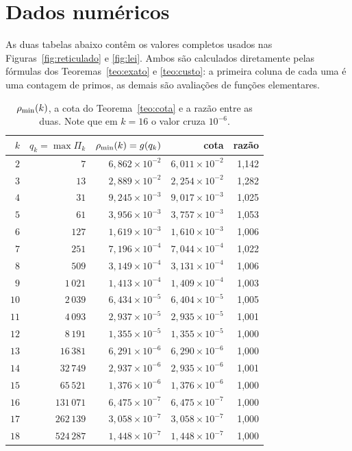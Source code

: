 \section{Dados numéricos}\label{ap:dados}

As duas tabelas abaixo contêm os valores completos usados nas
Figuras~\ref{fig:reticulado} e \ref{fig:lei}. Ambos são calculados diretamente
pelas fórmulas dos Teoremas~\ref{teo:exato} e \ref{teo:custo}: a primeira coluna de
cada uma é uma contagem de primos, as demais são avaliações de funções
elementares.

\begin{table}[htbp]
\centering
\small
\begin{tabular}{rrrrr}
\toprule
$k$ & $q_k=\max\Pi_k$ & $\rho_{\min}(k)=g(q_k)$ & cota & razão \\
\midrule
$2$  & $7$        & $6{,}862\times10^{-2}$ & $6{,}011\times10^{-2}$ & 1,142 \\
$3$  & $13$       & $2{,}889\times10^{-2}$ & $2{,}254\times10^{-2}$ & 1,282 \\
$4$  & $31$       & $9{,}245\times10^{-3}$ & $9{,}017\times10^{-3}$ & 1,025 \\
$5$  & $61$       & $3{,}956\times10^{-3}$ & $3{,}757\times10^{-3}$ & 1,053 \\
$6$  & $127$      & $1{,}619\times10^{-3}$ & $1{,}610\times10^{-3}$ & 1,006 \\
$7$  & $251$      & $7{,}196\times10^{-4}$ & $7{,}044\times10^{-4}$ & 1,022 \\
$8$  & $509$      & $3{,}149\times10^{-4}$ & $3{,}131\times10^{-4}$ & 1,006 \\
$9$  & $1\,021$   & $1{,}413\times10^{-4}$ & $1{,}409\times10^{-4}$ & 1,003 \\
$10$ & $2\,039$   & $6{,}434\times10^{-5}$ & $6{,}404\times10^{-5}$ & 1,005 \\
$11$ & $4\,093$   & $2{,}937\times10^{-5}$ & $2{,}935\times10^{-5}$ & 1,001 \\
$12$ & $8\,191$   & $1{,}355\times10^{-5}$ & $1{,}355\times10^{-5}$ & 1,000 \\
$13$ & $16\,381$  & $6{,}291\times10^{-6}$ & $6{,}290\times10^{-6}$ & 1,000 \\
$14$ & $32\,749$  & $2{,}937\times10^{-6}$ & $2{,}935\times10^{-6}$ & 1,001 \\
$15$ & $65\,521$  & $1{,}376\times10^{-6}$ & $1{,}376\times10^{-6}$ & 1,000 \\
$16$ & $131\,071$ & $6{,}475\times10^{-7}$ & $6{,}475\times10^{-7}$ & 1,000 \\
$17$ & $262\,139$ & $3{,}058\times10^{-7}$ & $3{,}058\times10^{-7}$ & 1,000 \\
$18$ & $524\,287$ & $1{,}448\times10^{-7}$ & $1{,}448\times10^{-7}$ & 1,000 \\
\bottomrule
\end{tabular}
\caption{$\rho_{\min}(k)$, a cota do Teorema~\ref{teo:cota} e a razão entre as
duas. Note que em $k=16$ o valor cruza $10^{-6}$.}
\label{tab:dadosrho}
\end{table}

